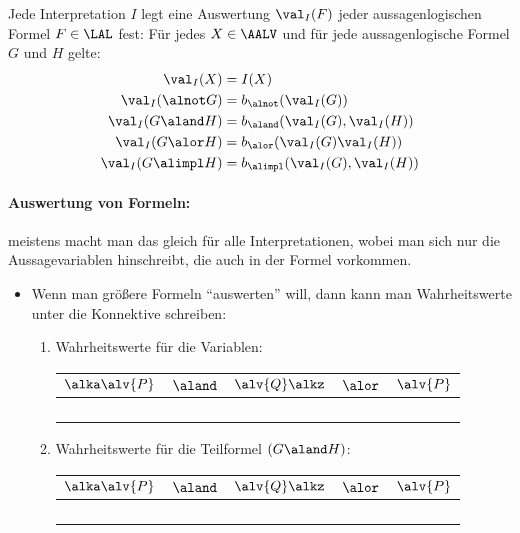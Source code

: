 Jede Interpretation $I$ legt eine Auswertung $\val_I(F)$ jeder
aussagenlogischen Formel $F\in\LAL$ fest: 
%
Für jedes $X\in\AALV$
und für jede aussagenlogische Formel $G$ und $H$ gelte:
%
\begin{align*}
  \val_I(X)         &= I(X) \\
  \val_I(\alnot G)   &= b_{\alnot}(\val_I(G)) \\
  \val_I(G \aland H) &= b_{\aland}(\val_I(G), \val_I(H)) \\
  \val_I(G \alor H)  &= b_{\alor}(\val_I(G)  \val_I(H)) \\
  \val_I(G \alimpl H)&= b_{\alimpl}(\val_I(G), \val_I(H))
\end{align*}
%
\begin{tutorium}
  \paragraph{Auswertung von Formeln:}
  meistens macht man das gleich für alle Interpretationen, wobei man
  sich nur die Aussagevariablen hinschreibt, die auch in der Formel
  vorkommen.
  \begin{itemize}
  \item Wenn man größere Formeln "`auswerten"' will, dann kann man
    Wahrheitswerte unter die Konnektive schreiben:
    \begin{enumerate}
    \item Wahrheitswerte für die Variablen:

      \begin{tabular}[t]{ccccc}
        \toprule
        $\alka\alv{P}$ & $\aland$ & $\alv{Q}\alkz$ & $\alor$ & $\alv{P}$\\
        \midrule
        \F && \F && \F \\
        \F && \W && \F\\
        \W && \F && \W\\
        \W && \W && \W\\
        \bottomrule
      \end{tabular}

    \item Wahrheitswerte für die Teilformel $(G\aland H)$:

      \begin{tabular}[t]{ccccc}
        \toprule
        $\alka\alv{P}$ & $\aland$ & $\alv{Q}\alkz$ & $\alor$ & $\alv{P}$\\
        \midrule
        \F &\F& \F && \F \\
        \F &\F& \W && \F\\
        \W &\F& \F && \W\\
        \W &\W& \W && \W\\
        \bottomrule
      \end{tabular}


\end{enumerate}
\end{itemize}
\end{tutorium}
